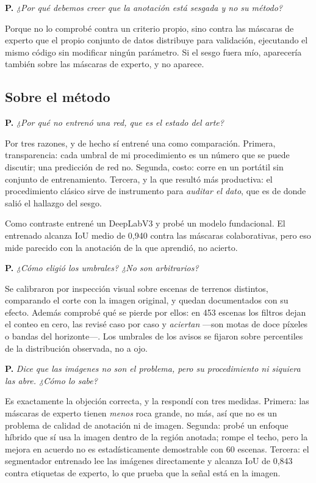 \documentclass[11pt]{article}
\newcommand{\pregunta}[1]{\medskip\noindent\textbf{\color{rojo}P.}\; \textit{#1}\par}
\begin{document}
\pregunta{¿Por qué debemos creer que la anotación está sesgada y no su método?}
\begin{resp}
Porque no lo comprobé contra un criterio propio, sino contra las máscaras de experto que el
propio conjunto de datos distribuye para validación, ejecutando el mismo código sin
modificar ningún parámetro. Si el sesgo fuera mío, aparecería también sobre las máscaras de
experto, y no aparece.
\end{resp}

\subsection*{Sobre el método}

\pregunta{¿Por qué no entrenó una red, que es el estado del arte?}
\begin{resp}
Por tres razones, y de hecho sí entrené una como comparación. Primera, transparencia: cada
umbral de mi procedimiento es un número que se puede discutir; una predicción de red no.
Segunda, costo: corre en un portátil sin conjunto de entrenamiento. Tercera, y la que
resultó más productiva: el procedimiento clásico sirve de instrumento para \emph{auditar el
dato}, que es de donde salió el hallazgo del sesgo.

Como contraste entrené un DeepLabV3 y probé un modelo fundacional. El entrenado alcanza IoU
medio de 0,940 contra las máscaras colaborativas, pero eso mide parecido con la anotación
de la que aprendió, no acierto.
\end{resp}

\pregunta{¿Cómo eligió los umbrales? ¿No son arbitrarios?}
\begin{resp}
Se calibraron por inspección visual sobre escenas de terrenos distintos, comparando el corte
con la imagen original, y quedan documentados con su efecto. Además comprobé qué se pierde
por ellos: en \num{453} escenas los filtros dejan el conteo en cero, las revisé caso por
caso y \emph{aciertan} —son motas de doce píxeles o bandas del horizonte—. Los umbrales de
los avisos se fijaron sobre percentiles de la distribución observada, no a ojo.
\end{resp}

\pregunta{Dice que las imágenes no son el problema, pero su procedimiento ni siquiera las
abre. ¿Cómo lo sabe?}
\begin{resp}
Es exactamente la objeción correcta, y la respondí con tres medidas. Primera: las máscaras
de experto tienen \emph{menos} roca grande, no más, así que no es un problema de calidad de
anotación ni de imagen. Segunda: probé un enfoque híbrido que sí usa la imagen dentro de la
región anotada; rompe el techo, pero la mejora en acuerdo no es estadísticamente
demostrable con \num{60} escenas. Tercera: el segmentador entrenado lee las imágenes
directamente y alcanza IoU de 0,843 contra etiquetas de experto, lo que prueba que la
señal está en la imagen.
\end{resp}
\end{document}
